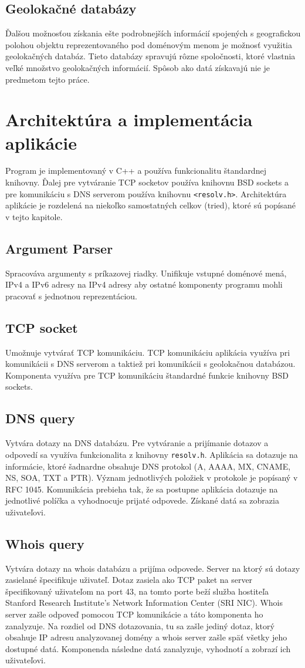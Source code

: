 \documentclass[a4paper, 11pt]{article}
\begin{document}
\subsection{Geolokačné databázy}
Ďalšou možnosťou získania ešte podrobnejších informácií spojených s geografickou polohou objektu reprezentovaného pod doménovým menom je možnosť využitia geolokačných databáz. Tieto databázy spravujú rôzne spoločnosti, ktoré vlastnia  veľké množstvo geolokačných informácií. Spôsob ako datá získavajú nie je predmetom tejto práce.

\section{Architektúra a implementácia aplikácie}
Program je implementovaný v C++ a používa funkcionalitu štandardnej knihovny. Ďalej pre vytváranie TCP socketov používa knihovnu BSD sockets a pre komunikáciu s DNS serverom používa knihovnu \texttt{<resolv.h>}. Architektúra aplikácie je rozdelená na niekoľko samostatných celkov (tried), ktoré sú popísané v tejto kapitole.
\subsection{Argument Parser} Spracováva argumenty s príkazovej riadky. Unifikuje vstupné doménové mená, IPv4 a IPv6 adresy na IPv4 adresy aby ostatné komponenty programu mohli pracovať s jednotnou reprezentáciou.
\subsection{TCP socket} Umožnuje vytvárať TCP komunikáciu. TCP komunikáciu aplikácia využíva pri komunikácii s DNS serverom a taktiež pri komunikácii s geolokačnou databázou. Komponenta využíva pre TCP komunikáciu štandardné funkcie knihovny BSD sockets.
\subsection{DNS query} Vytvára dotazy na DNS databázu. Pre vytváranie a prijímanie dotazov a odpovedí sa využíva funkcionalita z knihovny \texttt{resolv.h}. Aplikácia sa dotazuje na informácie, ktoré šadnardne obsahuje DNS protokol (A, AAAA, MX, CNAME, NS, SOA, TXT a PTR). Význam jednotlivých položiek v protokole je popísaný v RFC 1045\cite{RFC1035}. Komunikácia prebieha tak, že sa postupne aplikácia dotazuje na jednotlivé políčka a vyhodnocuje prijaté odpovede. Získané datá sa zobrazia uživateľovi.
\subsection{Whois query} Vytvára dotazy na whois databázu a prijíma odpovede. Server na ktorý sú dotazy zasielané špecifikuje uživateľ. Dotaz zasiela ako TCP paket na server špecifikovaný uživateľom na port 43, na tomto porte beží služba hostiteľa Stanford Research Institute’s Network Information Center (SRI NIC\cite{RFC0954}). Whois server zašle odpoveď pomocou TCP komunikácie a táto komponenta ho zanalyzuje. Na rozdiel od DNS dotazovania, tu sa zašle jediný dotaz, ktorý obsahuje IP adresu analyzovanej domény a whois server zašle späť všetky jeho dostupné datá. Komponenda následne datá zanalyzuje, vyhodnotí a zobrazí ich uživateľovi.
\end{document}
